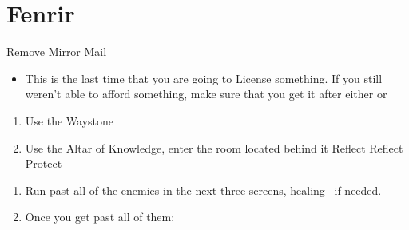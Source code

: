 \chapter{Fenrir}

\begin{equip}
\begin{itemize}
\vaanf Remove Mirror Mail
\end{itemize}
\end{equip}
\begin{liscense}
\begin{itemize}
	\item This is the last time that you are going to License something. If you still weren't able to afford something, make sure that you get it after either  or 
	\end{itemize}
\end{liscense}
\begin{enumerate}
	\item Use the Waystone
	\item Use the Altar of Knowledge, enter the room located behind it
	\penelof Reflect \penelo
	\ashef Reflect \ashe
	\vaanf Protect \vaan
\end{enumerate}
\begin{menu}
\end{menu}
\begin{equip}\begin{itemize}
\optimize{\vaan}
\end{itemize}\end{equip}
\begin{enumerate}[resume]
\item Run past all of the enemies in the next three screens, healing \vaan\ if needed.
\item Once you get past all of them:
\end{enumerate}
\begin{menu}
\party{\balthier, \ashe, \penelo}
\end{menu}
\begin{gambit}
	\begin{itemize}
	\end{itemize}
\end{gambit}
